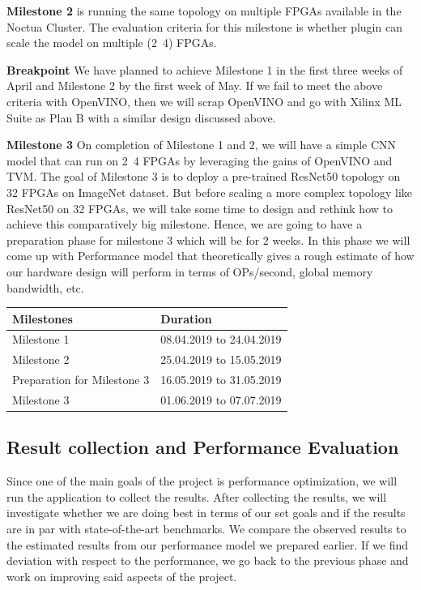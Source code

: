 \documentclass[titlepage]{report}
\begin{document}
\textbf{Milestone 2} is running the same topology on multiple FPGAs available in the Noctua Cluster. The evaluation criteria for this milestone is whether plugin can scale the model on multiple (2~4) FPGAs.

\textbf{Breakpoint} We have planned to achieve Milestone 1 in the first three weeks of April and Milestone 2 by the first week of May. If we fail to meet the above criteria with OpenVINO, then we will scrap OpenVINO and go with Xilinx ML Suite as Plan B with a similar design discussed above. 

\textbf{Milestone 3}  On completion of Milestone 1 and 2, we will have a simple CNN model that can run on 2~4 FPGAs by leveraging the gains of OpenVINO and TVM. The goal of Milestone 3 is to deploy a pre-trained ResNet50 topology on 32 FPGAs on ImageNet dataset. But before scaling a more complex topology like ResNet50 on 32 FPGAs, we will take some time to design and rethink how to achieve this comparatively big milestone. Hence, we are going to have a preparation phase for milestone 3 which will be for 2 weeks. In this phase we will come up with Performance model that theoretically gives a rough estimate of how our hardware design will perform in terms of OPs/second, global memory bandwidth, etc.

\begin{table}[]
\begin{tabular}{|l|l|}
\hline
Milestones                  & Duration                 \\ \hline
Milestone 1                 & 08.04.2019 to 24.04.2019 \\ \hline
Milestone 2                 & 25.04.2019 to 15.05.2019 \\ \hline
Preparation for Milestone 3 & 16.05.2019 to 31.05.2019 \\ \hline
Milestone 3                 & 01.06.2019 to 07.07.2019 \\ \hline
\end{tabular}
\end{table}

\subsection{Result collection and Performance Evaluation}
Since one of the main goals of the project is performance optimization, we will run the application to collect the results. After collecting the results, we will investigate whether we are doing best in terms of our set goals and if the results are in par with state-of-the-art benchmarks. We compare the observed results to the estimated results from our performance model we prepared earlier. If we find deviation with respect to the performance, we go back to the previous phase and work on improving said aspects of the project.
\end{document}
